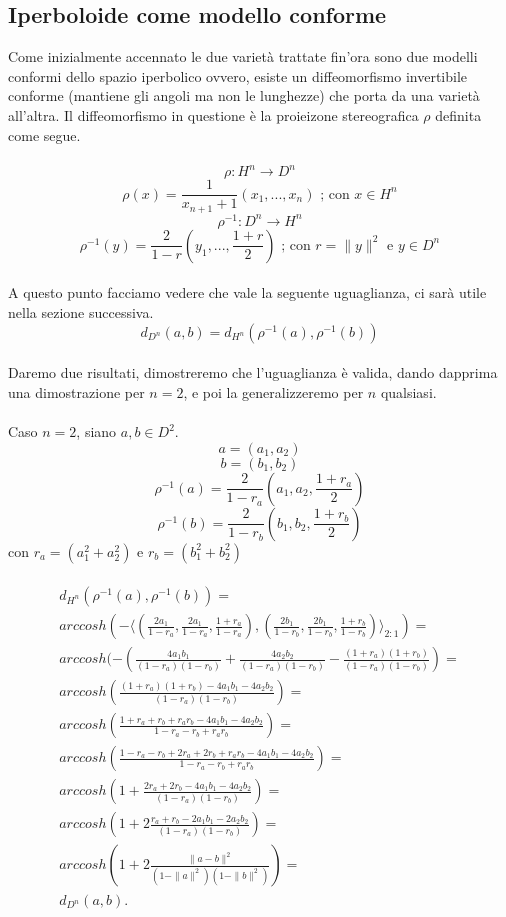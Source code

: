 \documentclass[a4paper, 12pt]{article}
\begin{document}
\subsection{Iperboloide come modello conforme}
Come inizialmente accennato le due varietà trattate fin'ora sono due modelli conformi dello spazio iperbolico ovvero, esiste un diffeomorfismo invertibile conforme (mantiene gli angoli ma non le lunghezze) che porta da una varietà all'altra. Il diffeomorfismo in questione è la proieizone stereografica $\rho$ definita come segue.\\\\
\[\rho : H^n \to D^n\]
\[\rho(x) = \frac{1}{x_{n+1} + 1}(x_1, ..., x_n) \mbox{ ; con } x \in H^n\]
\[\rho^{-1} : D^n \to H^n\]
\[\rho^{-1}(y) = \frac{2}{1 - r}(y_1, ..., \frac{1+r}{2}) \mbox{ ; con } r = \parallel y \parallel^2 \mbox{ e } y \in D^n\]\\
A questo punto facciamo vedere che vale la seguente uguaglianza, ci sarà utile nella sezione successiva.\\
\[d_{D^n}(a, b) = d_{H^n}(\rho^{-1}(a), \rho^{-1}(b))\]\\
Daremo due risultati, dimostreremo che l'uguaglianza è valida, dando dapprima una dimostrazione per $n = 2$, e poi la generalizzeremo per $n$ qualsiasi.\\\\
Caso $n=2$, siano $a, b \in D^2$.\\
\[a = (a_1, a_2)\]
\[b = (b_1, b_2)\]
\[\rho^{-1}(a) = \frac{2}{1-r_a}(a_1, a_2, \frac{1 + r_a}{2})\]
\[\rho^{-1}(b) = \frac{2}{1-r_b}(b_1, b_2, \frac{1 + r_b}{2})\]
con $r_a = (a_1^2 + a_2^2)$ e $r_b = (b_1^2 + b_2^2)$\\\\
\begin{equation*}\begin{gathered}
d_{H^n}(\rho^{-1}(a), \rho^{-1}(b)) = \\
arccosh(-\langle (\frac{2a_1}{1-r_a}, \frac{2a_1}{1-r_a}, \frac{1+r_a}{1-r_a}), (\frac{2b_1}{1-r_b}, \frac{2b_1}{1-r_b}, \frac{1+r_b}{1-r_b}) \rangle_{2:1}) =\\
arccosh(- (\frac{4a_1b_1}{(1-r_a)(1-r_b)} + \frac{4a_2b_2}{(1-r_a)(1-r_b)} - \frac{(1+r_a)(1+r_b)}{(1-r_a)(1-r_b)}) =\\
arccosh(\frac{(1+r_a)(1+r_b) - 4a_1b_1 - 4a_2b_2}{(1-r_a)(1-r_b)}) =\\
arccosh(\frac{1 + r_a +r_b + r_ar_b - 4a_1b_1 - 4a_2b_2}{1 - r_a - r_b + r_ar_b}) = \\
arccosh(\frac{1 -r_a -r_b + 2r_a + 2r_b + r_ar_b - 4a_1b_1 - 4a_2b_2}{1 - r_a - r_b + r_ar_b}) = \\
arccosh(1 + \frac{2r_a + 2r_b - 4a_1b_1 - 4a_2b_2}{(1-r_a)(1-r_b)}) =\\
arccosh(1 + 2 \frac{r_a + r_b - 2a_1b_1 - 2a_2b_2}{(1-r_a)(1-r_b)}) = \\
arccosh(1 + 2\frac{\parallel a - b \parallel^2}{(1 - \parallel a \parallel^2)(1 - \parallel b \parallel^2)}) =\\
d_{D^n}(a, b).
\end{gathered}\end{equation*}
\end{document}

